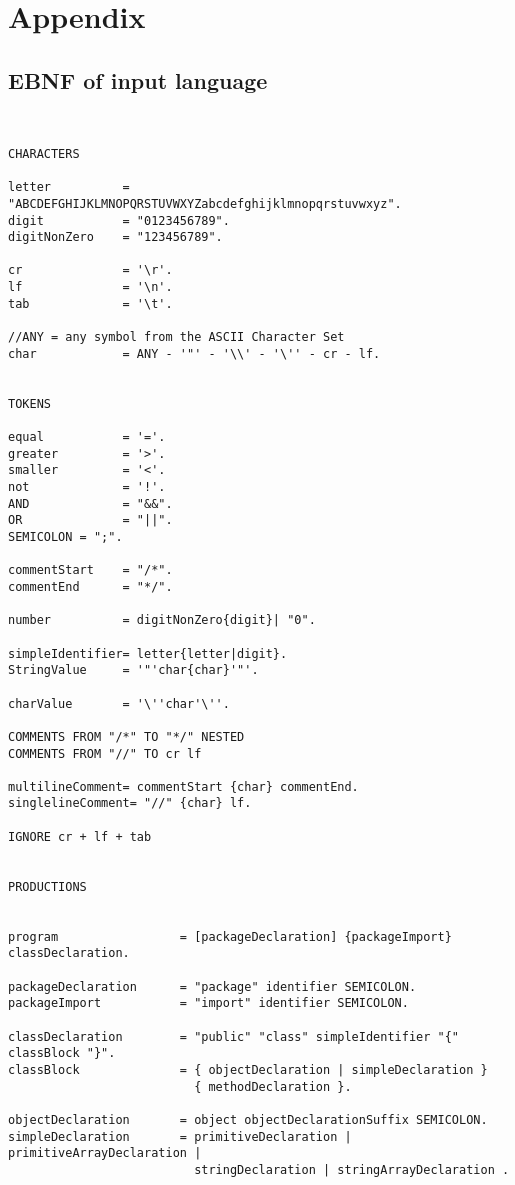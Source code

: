 \section{Appendix}
\subsection{EBNF of input language}
\label{labelEBNF}

\begin{verbatim}


CHARACTERS

letter          = "ABCDEFGHIJKLMNOPQRSTUVWXYZabcdefghijklmnopqrstuvwxyz".
digit           = "0123456789".
digitNonZero    = "123456789".

cr              = '\r'.
lf              = '\n'.
tab             = '\t'.

//ANY = any symbol from the ASCII Character Set
char            = ANY - '"' - '\\' - '\'' - cr - lf.


TOKENS

equal           = '='.
greater         = '>'.
smaller         = '<'.
not             = '!'.
AND             = "&&".
OR              = "||".
SEMICOLON = ";".

commentStart    = "/*".
commentEnd      = "*/".

number          = digitNonZero{digit}| "0".

simpleIdentifier= letter{letter|digit}.
StringValue     = '"'char{char}'"'.

charValue       = '\''char'\''.

COMMENTS FROM "/*" TO "*/" NESTED 
COMMENTS FROM "//" TO cr lf

multilineComment= commentStart {char} commentEnd.
singlelineComment= "//" {char} lf.

IGNORE cr + lf + tab


PRODUCTIONS 


program                 = [packageDeclaration] {packageImport} classDeclaration.

packageDeclaration      = "package" identifier SEMICOLON.
packageImport           = "import" identifier SEMICOLON.

classDeclaration        = "public" "class" simpleIdentifier "{" classBlock "}".
classBlock              = { objectDeclaration | simpleDeclaration } 
                          { methodDeclaration }.

objectDeclaration       = object objectDeclarationSuffix SEMICOLON. 
simpleDeclaration       = primitiveDeclaration | primitiveArrayDeclaration | 
                          stringDeclaration | stringArrayDeclaration .


\end{verbatim}
